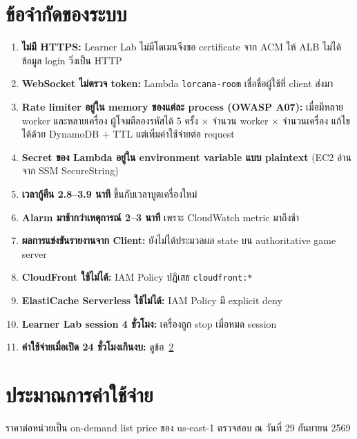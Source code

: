 \documentclass[12pt,a4paper]{report}
\begin{document}
\section{ข้อจำกัดของระบบ}

\begin{enumerate}
    \item \textbf{ไม่มี HTTPS:} Learner Lab ไม่มีโดเมนจึงขอ certificate จาก ACM ให้ ALB ไม่ได้ ข้อมูล login วิ่งเป็น HTTP
    \item \textbf{WebSocket ไม่ตรวจ token:} Lambda \texttt{lorcana-room} เชื่อชื่อผู้ใช้ที่ client ส่งมา
    \item \textbf{Rate limiter อยู่ใน memory ของแต่ละ process (OWASP A07):} เมื่อมีหลาย worker และหลายเครื่อง ผู้โจมตีลองรหัสได้ 5 ครั้ง $\times$ จำนวน worker $\times$ จำนวนเครื่อง แก้ไขได้ด้วย DynamoDB + TTL แต่เพิ่มค่าใช้จ่ายต่อ request
    \item \textbf{Secret ของ Lambda อยู่ใน environment variable แบบ plaintext} (EC2 อ่านจาก SSM SecureString)
    \item \textbf{เวลากู้คืน 2.8--3.9 นาที} ขึ้นกับเวลาบูตเครื่องใหม่
    \item \textbf{Alarm มาช้ากว่าเหตุการณ์ 2--3 นาที} เพราะ CloudWatch metric มาถึงช้า
    \item \textbf{ผลการแข่งขันรายงานจาก Client:} ยังไม่ได้ประมวลผล state บน authoritative game server
    \item \textbf{CloudFront ใช้ไม่ได้:} IAM Policy ปฏิเสธ \texttt{cloudfront:*}
    \item \textbf{ElastiCache Serverless ใช้ไม่ได้:} IAM Policy มี explicit deny
    \item \textbf{Learner Lab session 4 ชั่วโมง:} เครื่องถูก stop เมื่อหมด session
    \item \textbf{ค่าใช้จ่ายเมื่อเปิด 24 ชั่วโมงเกินงบ:} ดูข้อ~\ref{sec:cost}
\end{enumerate}

\section{ประมาณการค่าใช้จ่าย}
\label{sec:cost}

ราคาต่อหน่วยเป็น on-demand list price ของ us-east-1 ตรวจสอบ ณ วันที่ 29 กันยายน 2569
\end{document}
